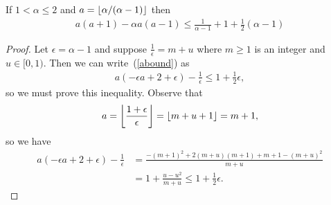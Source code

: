 \begin{lemma}
If $1<\alpha\leq 2$ and $a = \left\lfloor\alpha/(\alpha-1)\right \rfloor$ then
\begin{align}
\label{abound}
a(a+1) - \alpha a(a-1) \leq \frac{1}{\alpha - 1} + 1 + \frac{1}{2}(\alpha -1)
\end{align}
\end{lemma}
\begin{proof}
Let $\epsilon = \alpha - 1$ and suppose $\frac{1}{\epsilon} = m + u$ where $m \geq 1$ is an integer and $u \in [0,1)$.  Then we can write~(\ref{abound}) as
\begin{align*}
a(-\epsilon a +2 + \epsilon) - \frac{1}{\epsilon} \leq 1+ \frac12 \epsilon,
\end{align*}
so we must prove this inequality.  Observe that
\begin{align*}
a = \left\lfloor\frac{1 + \epsilon}{\epsilon}\right \rfloor = \left\lfloor m + u + 1\right \rfloor = m+1,
\end{align*}
so we have
\begin{align*}
a(-\epsilon a +2 + \epsilon) - \frac{1}{\epsilon} &= \frac{ - (m+1)^2 + 2(m+u)(m+1) + m+1 - (m+u)^2}{m+u}\\
&= 1 + \frac{u-u^2}{m+u} \leq 1 + \frac{1}{2}\epsilon.
\end{align*}
\end{proof}

